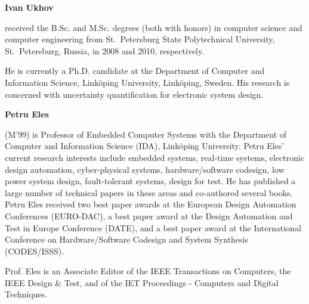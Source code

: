 \newenvironment{biography}[1]{%
\vspace{1em}%
\footnotesize%
\noindent\textbf{#1\ }%
}{\relax\par\normalfont}

\begin{biography}{Ivan Ukhov}
received the B.Sc. and M.Sc. degrees (both with honors) in computer science and computer engineering from St.~Petersburg State Polytechnical University, St.~Petersburg, Russia, in 2008 and 2010, respectively.

He is currently a Ph.D. candidate at the Department of Computer and Information Science, Link\"{o}ping University, Link\"{o}ping, Sweden.
His research is concerned with uncertainty quantification for electronic system design.
\end{biography}

\begin{biography}{Petru Eles}
(M'99) is Professor of Embedded Computer Systems with the Department of Computer and Information Science (IDA), Link\"{o}ping University.
Petru Eles' current research interests include embedded systems, real-time systems, electronic design automation, cyber-physical systems, hardware/software codesign, low power system design, fault-tolerant systems, design for test.
He has published a large number of technical papers in these areas and co-authored several books.
Petru Eles received two best paper awards at the European Design Automation Conferences (EURO-DAC), a best paper award at the Design Automation and Test in Europe Conference (DATE), and a best paper award at the International Conference on Hardware/Software Codesign and System Synthesis (CODES/ISSS).

Prof. Eles is an Associate Editor of the IEEE Transactions on Computers, the IEEE Design \& Test, and of the IET Proceedings - Computers and Digital Techniques.
\end{biography}

